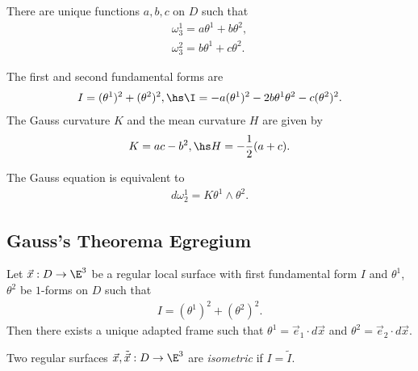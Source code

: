 \documentclass{article}
\begin{document}
\begin{lemma}[Notes 11.4]
	There are unique functions $a,b,c$ on $D$ such that
	\begin{align*}
		\omega_3^1 = a\theta^1+b\theta^2, \\
		\omega_3^2 = b\theta^1+c\theta^2.
	\end{align*}
\end{lemma}

\begin{proposition}[Notes 11.5]
	The first and second fundamental forms are
	\begin{align*}
		I = (\theta^1)^2 + (\theta^2)^2,\hs
		\I = -a(\theta^1)^2-2b\theta^1\theta^2-c(\theta^2)^2.
	\end{align*}
	The Gauss curvature $K$ and the mean curvature $H$ are given by
	\begin{align*}
		K=ac-b^2, \hs H=-\frac{1}{2}(a+c).
	\end{align*}
\end{proposition}

\begin{proposition}[Notes 11.6]
	The Gauss equation is equivalent to
	\begin{align*}
		d\omega_2^1 = K\theta^1\wedge\theta^2.
	\end{align*}
\end{proposition}

\subsection{Gauss's Theorema Egregium}

\begin{proposition}[Notes 11.9]
	Let $\vec x:D\to\E^3$ be a regular local surface with first fundamental form
	$I$ and $\theta^1$, $\theta^2$ be $1$-forms on $D$ such that
	\begin{align*}
		I = (\theta^1)^2+(\theta^2)^2.
	\end{align*}
	Then there exists a unique adapted frame such that $\theta^1=\vec e_1\cdot d\vec x$
	and $\theta^2 = \vec e_2 \cdot d\vec x$.
\end{proposition}

\begin{definition}
	Two regular surfaces $\vec x,\tilde{\vec x}:D\to\E^3$ are \emph{isometric}
	if $I=\tilde I$.
\end{definition}
\end{document}
